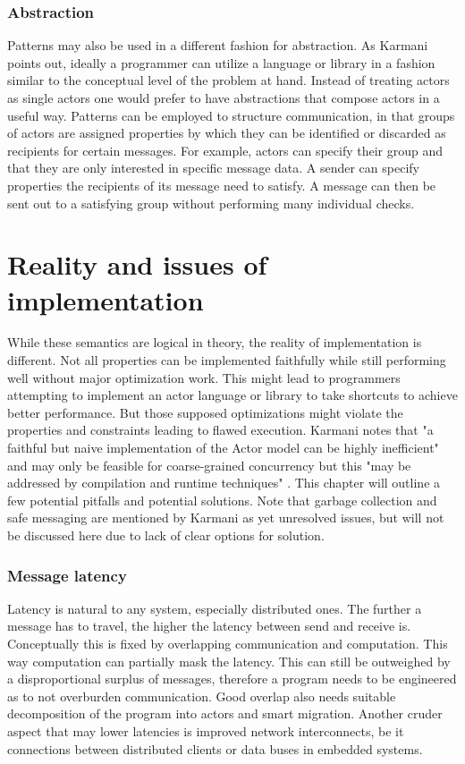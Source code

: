 \documentclass[A4]{article}
\begin{document}
\subsubsection{Abstraction}
Patterns may also be used in a different fashion for abstraction. As Karmani points out, ideally a programmer can utilize a language or library in a fashion similar to the conceptual level of the problem at hand. Instead of treating actors as single actors one would prefer to have abstractions that compose actors in a useful way. \cite[p.~7]{reference/parallel/KarmaniA11}
Patterns can be employed to structure communication, in that groups of actors are assigned properties by which they can be identified or discarded as recipients for certain messages. For example, actors can specify their group and that they are only interested in specific message data. A sender can specify properties the recipients of its message need to satisfy. A message can then be sent out to a satisfying group without performing many individual checks. 

\section{Reality and issues of implementation}
While these semantics are logical in theory, the reality of implementation is different. Not all properties can be implemented faithfully while still performing well without major optimization work. This might lead to programmers attempting to implement an actor language or library to take shortcuts to achieve better performance. But those supposed optimizations might violate the properties and constraints leading to flawed execution. Karmani notes that "a faithful but naive implementation of the Actor model can be highly inefficient" \cite[p.~8]{reference/parallel/KarmaniA11} and may only be feasible for coarse-grained concurrency \cite[p.~7]{conf/pppj/KarmaniSA09} but this "may be addressed by compilation and runtime techniques" \cite[p.~8]{reference/parallel/KarmaniA11}. This chapter will outline a few potential pitfalls and potential solutions.
Note that garbage collection and safe messaging are mentioned by Karmani as yet unresolved issues\cite[p.~10]{conf/pppj/KarmaniSA09}, but will not be discussed here due to lack of clear options for solution.
\subsubsection{Message latency}
Latency is natural to any system, especially distributed ones. The further a message has to travel, the higher the latency between send and receive is. 
Conceptually this is fixed by overlapping communication and computation. This way computation can partially mask the latency. This can still be outweighed by a disproportional surplus of messages, therefore a program needs to be engineered as to not overburden communication. Good overlap also needs suitable decomposition of the program into actors and smart migration. \cite[p.~8]{reference/parallel/KarmaniA11}
Another cruder aspect that may lower latencies is improved network interconnects, be it connections between distributed clients or data buses in embedded systems. 
\end{document}
